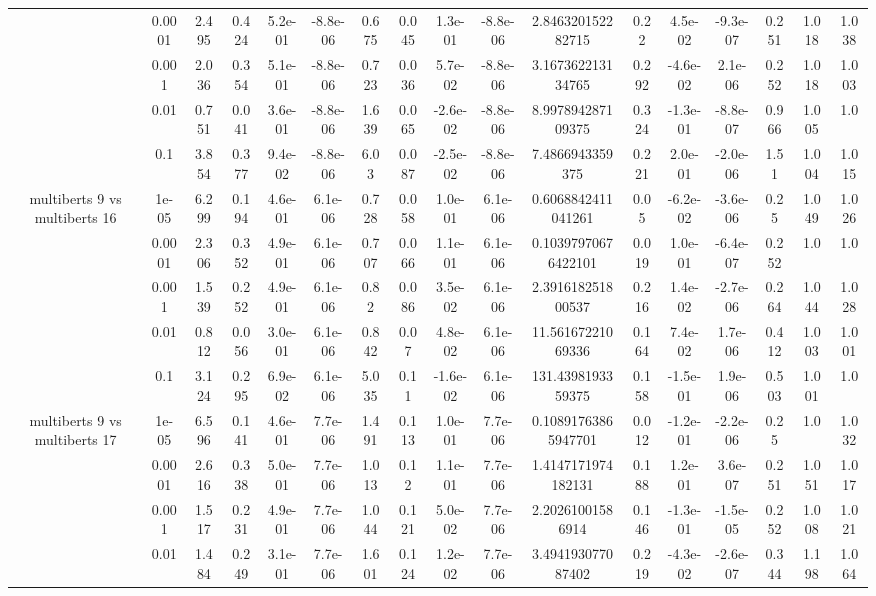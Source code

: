 \begin{tabular}{|c|c|c|c|c|c|c|c|c|c|c|c|c|c|c|c|c|}
 & 0.0001 & 2.495 & 0.424 & 5.2e-01 & -8.8e-06 & 0.675 & 0.045 & 1.3e-01 & -8.8e-06 & 2.846320152282715 & 0.22 & 4.5e-02 & -9.3e-07 & 0.251 & 1.018 & 1.038 \\
 & 0.001 & 2.036 & 0.354 & 5.1e-01 & -8.8e-06 & 0.723 & 0.036 & 5.7e-02 & -8.8e-06 & 3.167362213134765 & 0.292 & -4.6e-02 & 2.1e-06 & 0.252 & 1.018 & 1.003 \\
 & 0.01 & 0.751 & 0.041 & 3.6e-01 & -8.8e-06 & 1.639 & 0.065 & -2.6e-02 & -8.8e-06 & 8.997894287109375 & 0.324 & -1.3e-01 & -8.8e-07 & 0.966 & 1.005 & 1.0 \\
 & 0.1 & 3.854 & 0.377 & 9.4e-02 & -8.8e-06 & 6.03 & 0.087 & -2.5e-02 & -8.8e-06 & 7.4866943359375 & 0.221 & 2.0e-01 & -2.0e-06 & 1.51 & 1.004 & 1.015 \\
\hline
\multirow{5}{*}{multiberts 9 vs multiberts 16} & 1e-05 & 6.299 & 0.194 & 4.6e-01 & 6.1e-06 & 0.728 & 0.058 & 1.0e-01 & 6.1e-06 & 0.6068842411041261 & 0.05 & -6.2e-02 & -3.6e-06 & 0.25 & 1.049 & 1.026 \\
 & 0.0001 & 2.306 & 0.352 & 4.9e-01 & 6.1e-06 & 0.707 & 0.066 & 1.1e-01 & 6.1e-06 & 0.10397970676422101 & 0.019 & 1.0e-01 & -6.4e-07 & 0.252 & 1.0 & 1.0 \\
 & 0.001 & 1.539 & 0.252 & 4.9e-01 & 6.1e-06 & 0.82 & 0.086 & 3.5e-02 & 6.1e-06 & 2.391618251800537 & 0.216 & 1.4e-02 & -2.7e-06 & 0.264 & 1.044 & 1.028 \\
 & 0.01 & 0.812 & 0.056 & 3.0e-01 & 6.1e-06 & 0.842 & 0.07 & 4.8e-02 & 6.1e-06 & 11.56167221069336 & 0.164 & 7.4e-02 & 1.7e-06 & 0.412 & 1.003 & 1.001 \\
 & 0.1 & 3.124 & 0.295 & 6.9e-02 & 6.1e-06 & 5.035 & 0.11 & -1.6e-02 & 6.1e-06 & 131.4398193359375 & 0.158 & -1.5e-01 & 1.9e-06 & 0.503 & 1.001 & 1.0 \\
\hline
\multirow{5}{*}{multiberts 9 vs multiberts 17} & 1e-05 & 6.596 & 0.141 & 4.6e-01 & 7.7e-06 & 1.491 & 0.113 & 1.0e-01 & 7.7e-06 & 0.10891763865947701 & 0.012 & -1.2e-01 & -2.2e-06 & 0.25 & 1.0 & 1.032 \\
 & 0.0001 & 2.616 & 0.338 & 5.0e-01 & 7.7e-06 & 1.013 & 0.12 & 1.1e-01 & 7.7e-06 & 1.4147171974182131 & 0.188 & 1.2e-01 & 3.6e-07 & 0.251 & 1.051 & 1.017 \\
 & 0.001 & 1.517 & 0.231 & 4.9e-01 & 7.7e-06 & 1.044 & 0.121 & 5.0e-02 & 7.7e-06 & 2.20261001586914 & 0.146 & -1.3e-01 & -1.5e-05 & 0.252 & 1.008 & 1.021 \\
 & 0.01 & 1.484 & 0.249 & 3.1e-01 & 7.7e-06 & 1.601 & 0.124 & 1.2e-02 & 7.7e-06 & 3.494193077087402 & 0.219 & -4.3e-02 & -2.6e-07 & 0.344 & 1.198 & 1.064 \\

\end{tabular}
